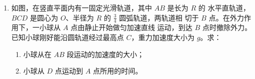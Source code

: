 \begin{enumerate}
\begin{enumerate}
\end{enumerate}
\begin{figure}[h!]
\flushright

\end{figure}




\newpage
\item 
{}
如图，在竖直平面内有一固定光滑轨道，其中 $ AB $ 是长为 $ R $ 的
水平直轨道，$ BCD $ 是圆心为 $ O $、半径为 $ R $ 的
$ \frac{ 3 }{ 4 } $
圆弧轨道，两轨道相
切于 $ B $ 点。在外力作用下，一小球从 $ A $ 点由静止开始做匀加速直线
运动，到达 $ B $ 点时撤除外力。已知小球刚好能沿圆轨道经过最高点
$ C $，重力加速度大小为 $ g $。求：
\begin{enumerate}
\renewcommand{\labelenumi}{\arabic{enumi}.}
\item
小球从在 $ AB $ 段运动的加速度的大小；
\item 
小球从 $ D $ 点运动到 $ A $ 点所用的时间。



\end{enumerate}
\begin{figure}[h!]
\flushright

\end{figure}

\end{enumerate}
